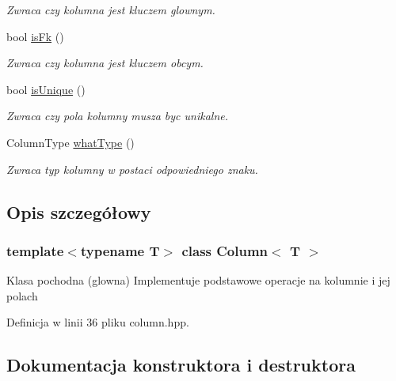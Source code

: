 \begin{DoxyCompactItemize}
\begin{DoxyCompactList}\small\item\em Zwraca czy kolumna jest kluczem glownym. \end{DoxyCompactList}\item 
\mbox{\label{class_column_a8ec7fb1f80b67714e6b4963ed7237788}} 
bool \mbox{\hyperlink{class_column_a8ec7fb1f80b67714e6b4963ed7237788}{is\+Fk}} ()
\begin{DoxyCompactList}\small\item\em Zwraca czy kolumna jest kluczem obcym. \end{DoxyCompactList}\item 
\mbox{\label{class_column_a739b9804e0543ca88f215a7a42f9efe9}} 
bool \mbox{\hyperlink{class_column_a739b9804e0543ca88f215a7a42f9efe9}{is\+Unique}} ()
\begin{DoxyCompactList}\small\item\em Zwraca czy pola kolumny musza byc unikalne. \end{DoxyCompactList}\item 
\mbox{\label{class_column_a676736d57fd4a0b6ffc35f20ab65cdcf}} 
Column\+Type \mbox{\hyperlink{class_column_a676736d57fd4a0b6ffc35f20ab65cdcf}{what\+Type}} ()
\begin{DoxyCompactList}\small\item\em Zwraca typ kolumny w postaci odpowiedniego znaku. \end{DoxyCompactList}\end{DoxyCompactItemize}


\subsection{Opis szczegółowy}
\subsubsection*{template$<$typename T$>$\newline
class Column$<$ T $>$}

Klasa pochodna (glowna) Implementuje podstawowe operacje na kolumnie i jej polach 

Definicja w linii 36 pliku column.\+hpp.



\subsection{Dokumentacja konstruktora i destruktora}
\mbox{\label{class_column_ac244a78d96a7a83cb2bf201a4b65cc60}} 
